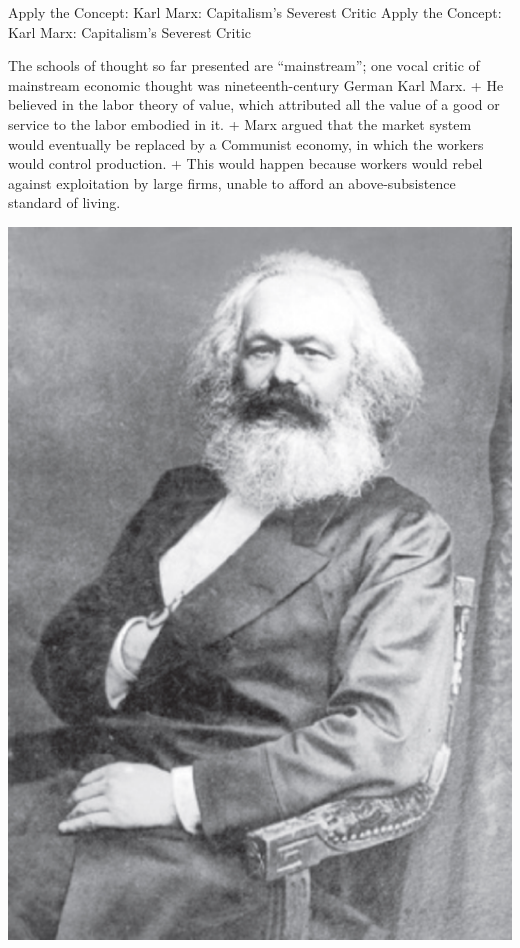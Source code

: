 \documentclass[
  12pt,
  ignorenonframetext,
]{beamer}
\begin{document}
\begin{frame}{Apply the Concept: Karl Marx: Capitalism's Severest
Critic}
\protect\hypertarget{apply-the-concept-karl-marx-capitalisms-severest-critic}{}
Apply the Concept: Karl Marx: Capitalism's Severest Critic

The schools of thought so far presented are ``mainstream''; one vocal
critic of mainstream economic thought was nineteenth-century German Karl
Marx. + He believed in the labor theory of value, which attributed all
the value of a good or service to the labor embodied in it. + Marx
argued that the market system would eventually be replaced by a
Communist economy, in which the workers would control production. + This
would happen because workers would rebel against exploitation by large
firms, unable to afford an above-subsistence standard of living.

\includegraphics[width=\textwidth,height=0.99\textheight]{imgs3/img_slide57a.png}
\end{frame}
\end{document}
